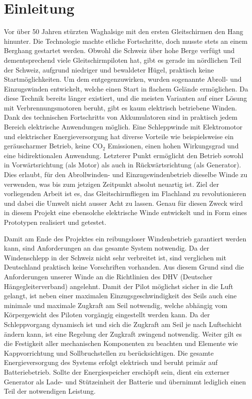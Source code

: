 \section{Einleitung}
Vor über 50 Jahren stürzten Waghalsige mit den ersten Gleitschirmen den Hang hinunter. Die Technologie machte etliche Fortschritte, doch musste stets an einem Berghang gestartet werden. Obwohl die Schweiz über hohe Berge verfügt und dementsprechend viele Gleitschirmpiloten hat, gibt es gerade im nördlichen Teil der Schweiz, aufgrund niedriger und bewaldeter Hügel, praktisch keine Startmöglichkeiten. Um dem entgegenzuwirken, wurden sogenannte Abroll- und Einzugswinden entwickelt, welche einen Start in flachem Gelände ermöglichen. Da diese Technik bereits länger existiert, und die meisten Varianten auf einer Lösung mit Verbrennungsmotoren beruht, gibt es kaum elektrisch betriebene Winden. Dank des technischen Fortschritts von Akkumulatoren sind in praktisch jedem Bereich elektrische Anwendungen möglich. Eine Schleppwinde mit Elektromotor und elektrischer Energieversorgung hat diverse Vorteile wie beispielsweise ein geräuscharmer Betrieb, keine CO$_{2}$ Emissionen, einen hohen Wirkungsgrad und eine bidirektionalen Anwendung. Letzterer Punkt ermöglicht den Betrieb sowohl in Vorwärtsrichtung (als Motor) als auch in Rückwärtsrichtung (als Generator). Dies erlaubt, für den Abrollwinden- und Einzugswindenbetrieb dieselbe Winde zu verwenden, was bis zum jetzigen Zeitpunkt absolut neuartig ist. 
Ziel der vorliegenden Arbeit ist es, das Gleitschirmfliegen im Flachland zu revolutionieren und dabei die Umwelt nicht ausser Acht zu lassen. Genau für diesen Zweck wird in diesem Projekt eine ebensolche elektrische Winde entwickelt und in Form eines Prototypen realisiert und getestet.

Damit am Ende des Projektes ein reibungsloser Windenbetrieb garantiert werden kann, sind Anforderungen an das gesamte System notwendig. Da der Windenschlepp in der Schweiz nicht sehr verbreitet ist, sind verglichen mit Deutschland praktisch keine Vorschriften vorhanden. Aus diesem Grund sind die Anforderungen unserer Winde an die Richtlinien des DHV (Deutscher Hängegleiterverband) angelehnt.
Damit der Pilot möglichst sicher in die Luft gelangt, ist neben einer maximalen Einzugsgeschwindigkeit des Seils auch eine minimale und maximale Zugkraft am Seil notwendig, welche abhängig vom Körpergewicht des Piloten vorgängig eingestellt werden kann. Da der Schleppvorgang dynamisch ist und sich die Zugkraft am Seil je nach Luftschicht ändern kann, ist eine Regelung der Zugkraft zwingend notwendig. Weiter gilt es die Festigkeit aller mechanischen Komponenten zu beachten und Elemente wie Kappvorrichtung und Sollbruchstellen zu berücksichtigen. Die gesamte Energieversorgung des Systems erfolgt elektrisch und beruht primär auf Batteriebetrieb. Sollte der Energiespeicher erschöpft sein, dient ein externer Generator als Lade- und Stützeinheit der Batterie und übernimmt lediglich einen Teil der notwendigen Leistung.

